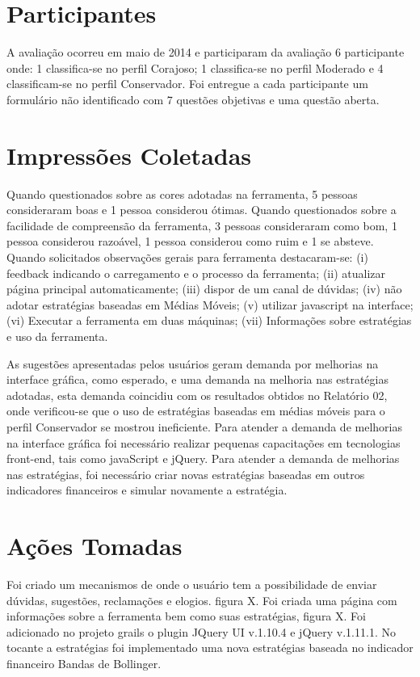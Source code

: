 \begin{apendicesenv}
\section{Participantes}
A avaliação ocorreu em maio de 2014 e participaram da avaliação 6 participante onde: 1 classifica-se no perfil Corajoso; 1 classifica-se no perfil Moderado e 4 classificam-se no perfil Conservador. Foi entregue a cada participante um formulário não identificado com 7 questões objetivas e uma questão aberta. 

\section{Impressões Coletadas}
Quando questionados sobre as cores adotadas na ferramenta, 5 pessoas consideraram boas e 1 pessoa considerou ótimas. Quando questionados sobre a facilidade de compreensão da ferramenta, 3 pessoas consideraram como bom, 1 pessoa considerou razoável, 1 pessoa considerou como ruim e 1 se absteve. Quando solicitados observações gerais para ferramenta destacaram-se: (i) feedback indicando o carregamento e o processo da ferramenta; (ii) atualizar página principal automaticamente; (iii) dispor de um canal de dúvidas; (iv) não adotar estratégias baseadas em Médias Móveis; (v) utilizar javascript na interface; (vi) Executar a ferramenta em duas máquinas; (vii) Informações sobre estratégias e uso da ferramenta.

As sugestões apresentadas pelos usuários geram demanda por melhorias na interface gráfica, como esperado, e uma demanda na melhoria nas estratégias adotadas, esta demanda coincidiu com os resultados obtidos no Relatório 02, onde verificou-se que o uso de estratégias baseadas em médias móveis para o perfil Conservador se mostrou ineficiente. Para atender a demanda de melhorias na interface gráfica foi necessário realizar pequenas capacitações em tecnologias front-end, tais como javaScript e jQuery. Para atender a demanda de melhorias nas estratégias, foi necessário criar novas estratégias baseadas em outros indicadores financeiros e simular novamente a estratégia.

\section{Ações Tomadas} 
Foi criado um mecanismos de onde o usuário tem a possibilidade de enviar dúvidas, sugestões, reclamações e elogios. figura X. Foi criada uma página com informações sobre a ferramenta bem como suas estratégias, figura X. Foi adicionado no projeto grails o plugin JQuery UI v.1.10.4 e jQuery v.1.11.1. No tocante a estratégias foi implementado uma nova estratégias baseada no indicador financeiro Bandas de Bollinger.



\end{apendicesenv}
